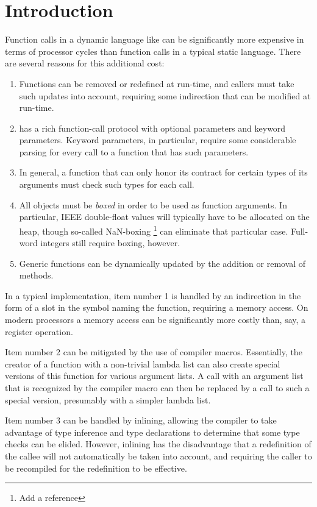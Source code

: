 \section{Introduction}
\label{sec-introduction}

Function calls in a dynamic language like \commonlisp{} can be
significantly more expensive in terms of processor cycles than
function calls in a typical static language.  There are several
reasons for this additional cost:

\begin{enumerate}
\item Functions can be removed or redefined at run-time, and callers
  must take such updates into account, requiring some indirection that
  can be modified at run-time.
\item \commonlisp{} has a rich function-call protocol with optional
  parameters and keyword parameters.  Keyword parameters, in
  particular, require some considerable parsing for every
  call to a function that has such parameters.
\item In general, a function that can only honor its contract for
  certain types of its arguments must check such types for each call.
\item All objects must be \emph{boxed} in order to be used as function
  arguments.  In particular, IEEE double-float values will typically
  have to be allocated on the heap, though so-called NaN-boxing%
  \footnote{Add a reference} can
  eliminate that particular case.  Full-word integers still require
  boxing, however.
\item Generic functions can be dynamically updated by the addition or
  removal of methods.
\end{enumerate}

In a typical \commonlisp{} implementation, item number 1 is handled by
an indirection in the form of a slot in the symbol naming the
function, requiring a memory access.  On modern processors a memory
access can be significantly more costly than, say, a register
operation.

Item number 2 can be mitigated by the use of compiler macros.
Essentially, the creator of a function with a non-trivial lambda list
can also create special versions of this function for various argument
lists.  A call with an argument list that is recognized by the
compiler macro can then be replaced by a call to such a special
version, presumably with a simpler lambda list.

Item number 3 can be handled by inlining, allowing the compiler to
take advantage of type inference and type declarations to determine
that some type checks can be elided.  However, inlining has the
disadvantage that a redefinition of the callee will not automatically
be taken into account, and requiring the caller to be recompiled for
the redefinition to be effective.


